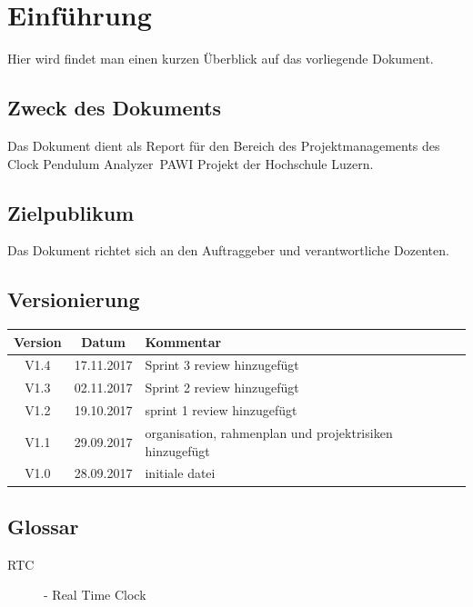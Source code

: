 \documentclass[a4paper, 10pt, fleqn]{article}
\newcommand{\documenttitle}{Clock Pendulum Analyzer} %
\begin{document}
	\begin{titlepage}
		\titleGM
		\thispagestyle{empty}
	\end{titlepage}
	
	\tableofcontents
	\listoffigures
	\listoftables
	
	\clearpage
	\section{Einführung}
        Hier wird findet man einen kurzen Überblick auf das vorliegende Dokument.
		\subsection{Zweck des Dokuments}
        Das Dokument dient als Report für den Bereich des Projektmanagements des \documenttitle\ PAWI Projekt der Hochschule Luzern.
		\subsection{Zielpublikum}
        Das Dokument richtet sich an den Auftraggeber und verantwortliche Dozenten.
		\subsection{Versionierung}
			\begin{table}[h]
				\centering
				\begin{tabularx}{\textwidth}{|c|c|X|}
				\hline
				\rowcolor{shadecolor}\textbf{Version} & \textbf{Datum} & \textbf{Kommentar}\\ \hline
                V1.4 & 17.11.2017 & Sprint 3 review hinzugefügt\\
                V1.3 & 02.11.2017 & Sprint 2 review hinzugefügt\\
                V1.2 & 19.10.2017 & sprint 1 review hinzugefügt\\
                V1.1 & 29.09.2017 & organisation, rahmenplan und projektrisiken hinzugefügt\\
				V1.0 & 28.09.2017 & initiale datei \\ \hline
				\end{tabularx}
			\end{table}
		\subsection{Glossar}
			\begin{description}
				\item[RTC]- Real Time Clock
			\end{description}
\end{document}
